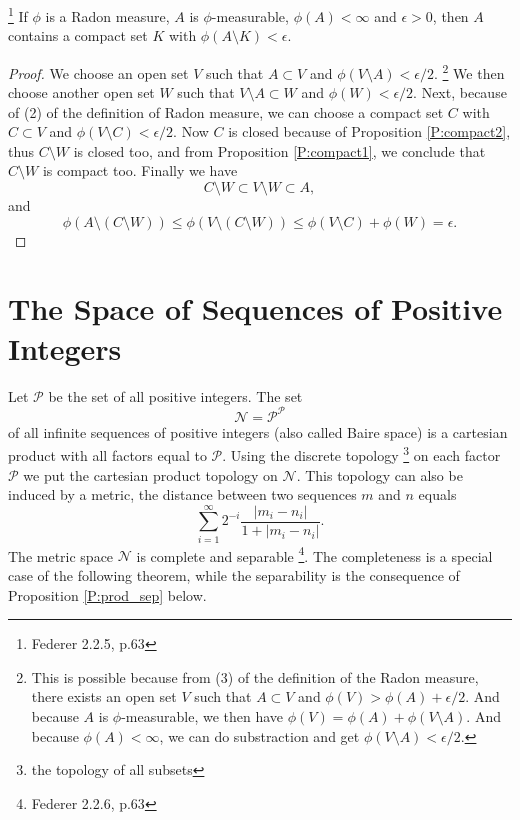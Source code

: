 \begin{proposition}
\footnote{Federer 2.2.5, p.63}
If $\phi$ is a Radon measure, $A$ is $\phi$-measurable, $\phi(A)<\infty$ and
$\epsilon>0$, then $A$ contains a compact set $K$ with 
$\phi(A\setminus K)<\epsilon$.
\end{proposition}
\begin{proof}
We choose an open set $V$ such that $A\subset V$ and 
$\phi(V\setminus A)<\epsilon/2$. 
\footnote{This is possible because from (3) of the definition of the Radon 
    measure, there exists an open set $V$ such that $A\subset V$ and
    $\phi(V)>\phi(A)+\epsilon/2$. And because $A$ is $\phi$-measurable, we then
    have $\phi(V)=\phi(A)+\phi(V\setminus A)$. And because $\phi(A)<\infty$, we
    can do substraction and get $\phi(V\setminus A)<\epsilon/2$.}
We then choose another open set $W$ such that 
$V\setminus A\subset W$ and $\phi(W)<\epsilon/2$. 
Next, because of (2) of the definition of Radon measure, we can choose a compact
set $C$ with $C\subset V$ and $\phi(V\setminus C)<\epsilon/2$. Now 
$C$ is closed because of Proposition \ref{P:compact2}, thus $C\setminus W$ is
closed too, and from Proposition \ref{P:compact1}, we conclude that 
$C\setminus W$ is compact too. Finally we have
\[
  C\setminus W \subset V\setminus W \subset A,
\]
and 
\[
  \phi(A\setminus (C\setminus W)) \le \phi(V\setminus (C\setminus W))
    \le \phi(V\setminus C) + \phi(W) = \epsilon.
\]
\end{proof}


\section{The Space of Sequences of Positive Integers}

Let $\mathcal{P}$ be the set of all positive integers. The set
\[
  \mathcal{N} = \mathcal{P}^{\mathcal{P}}
\]
of all infinite sequences of positive integers 
(also called Baire space)
is a cartesian product with all
factors equal to $\mathcal{P}$. Using the discrete topology
\footnote{the topology of all subsets}
on each factor $\mathcal{P}$ we put the cartesian product topology on
$\mathcal{N}$. This topology can also be induced by a metric, the distance
between two sequences $m$ and $n$ equals
\begin{equation} \label{E:dist_seq}
  \sum_{i=1}^{\infty} 2^{-i} \frac{|m_i-n_i|}{1+|m_i-n_i|}.
\end{equation}
The metric space $\mathcal{N}$ is complete and separable
\footnote{Federer 2.2.6, p.63}. The completeness is a special case of the 
following theorem, while the separability is the consequence of 
Proposition \ref{P:prod_sep} below.

